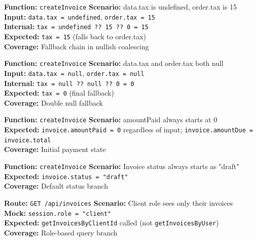 ﻿\documentclass[12pt,a4paper]{report}
\newcommand{\pone}{\textbf{\color{p1red}P1}}
\newcommand{\ptwo}{\textbf{\color{p2orange}P2}}
\newcommand{\pthree}{\textbf{\color{p3blue}P3}}
\begin{document}
\begin{tcolorbox}[testbox,title={INV-009 \hfill \pthree}]
\textbf{Function:} \texttt{createInvoice} \quad \textbf{Scenario:} data.tax is undefined, order.tax is 15 \\
\textbf{Input:} \texttt{data.tax = undefined}, \texttt{order.tax = 15} \\
\textbf{Internal:} \texttt{tax = undefined ?? 15 ?? 0 = 15} \\
\textbf{Expected:} \texttt{tax = 15} (falls back to order.tax) \\
\textbf{Coverage:} Fallback chain in nullish coalescing
\end{tcolorbox}

\begin{tcolorbox}[testbox,title={INV-010 \hfill \pthree}]
\textbf{Function:} \texttt{createInvoice} \quad \textbf{Scenario:} data.tax and order.tax both null \\
\textbf{Input:} \texttt{data.tax = null}, \texttt{order.tax = null} \\
\textbf{Internal:} \texttt{tax = null ?? null ?? 0 = 0} \\
\textbf{Expected:} \texttt{tax = 0} (final fallback) \\
\textbf{Coverage:} Double null fallback
\end{tcolorbox}

\begin{tcolorbox}[testbox,title={INV-011 \hfill \pone}]
\textbf{Function:} \texttt{createInvoice} \quad \textbf{Scenario:} amountPaid always starts at 0 \\
\textbf{Expected:} \texttt{invoice.amountPaid = 0} regardless of input; \texttt{invoice.amountDue = invoice.total} \\
\textbf{Coverage:} Initial payment state
\end{tcolorbox}

\begin{tcolorbox}[testbox,title={INV-012 \hfill \pone}]
\textbf{Function:} \texttt{createInvoice} \quad \textbf{Scenario:} Invoice status always starts as "draft" \\
\textbf{Expected:} \texttt{invoice.status = "draft"} \\
\textbf{Coverage:} Default status branch
\end{tcolorbox}

\begin{tcolorbox}[testbox,title={INV-013 \hfill \ptwo}]
\textbf{Route:} \texttt{GET /api/invoices} \quad \textbf{Scenario:} Client role sees only their invoices \\
\textbf{Mock:} \texttt{session.role = "client"} \\
\textbf{Expected:} \texttt{getInvoicesByClientId} called (not \texttt{getInvoicesByUser}) \\
\textbf{Coverage:} Role-based query branch
\end{tcolorbox}
\end{document}
